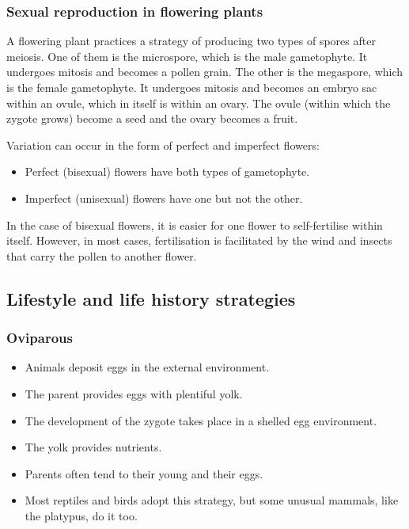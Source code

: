 \documentclass[11pt]{article}
\begin{document}
\subsubsection{Sexual reproduction in flowering plants}
\label{sec:org8cb7272}
A flowering plant practices a strategy of producing two types of spores after meiosis. One of them is the microspore, which is the male gametophyte. It undergoes mitosis and becomes a pollen grain. The other is the megaspore, which is the female gametophyte. It undergoes mitosis and becomes an embryo sac within an ovule, which in itself is within an ovary. The ovule (within which the zygote grows) become a seed and the ovary becomes a fruit.


Variation can occur in the form of perfect and imperfect flowers:
\begin{itemize}
\item Perfect (bisexual) flowers have both types of gametophyte.
\item Imperfect (unisexual) flowers have one but not the other.
\end{itemize}

In the case of bisexual flowers, it is easier for one flower to self-fertilise within itself. However, in most cases, fertilisation is facilitated by the wind and insects that carry the pollen to another flower.

\newpage
\subsection{Lifestyle and life history strategies}
\label{sec:org2ca3546}

\subsubsection{Oviparous}
\label{sec:org2539991}
\begin{itemize}
\item Animals deposit eggs in the external environment.
\item The parent provides eggs with plentiful yolk.
\item The development of the zygote takes place in a shelled egg environment.
\item The yolk provides nutrients.
\item Parents often tend to their young and their eggs.
\item Most reptiles and birds adopt this strategy, but some unusual mammals, like the platypus, do it too.
\end{itemize}
\end{document}
